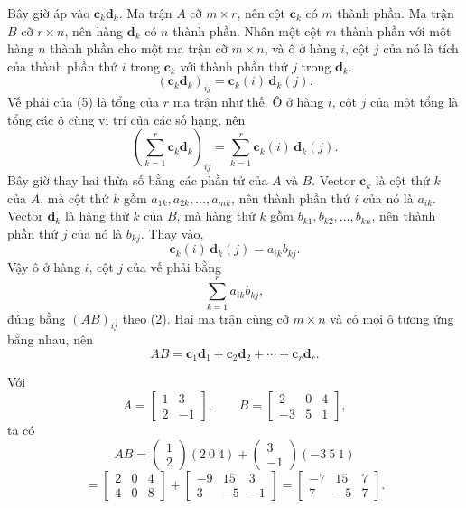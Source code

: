 \documentclass[12pt,a4paper]{article}
\begin{document}
Bây giờ áp vào \(\mathbf{c}_k\mathbf{d}_k\). Ma trận \(A\) cỡ \(m\times r\), nên cột \(\mathbf{c}_k\) có \(m\) thành phần. Ma trận \(B\) cỡ \(r\times n\), nên hàng \(\mathbf{d}_k\) có \(n\) thành phần. Nhân một cột \(m\) thành phần với một hàng \(n\) thành phần cho một ma trận cỡ \(m\times n\), và ô ở hàng \(i\), cột \(j\) của nó là tích của thành phần thứ \(i\) trong \(\mathbf{c}_k\) với thành phần thứ \(j\) trong \(\mathbf{d}_k\).
$$
(\mathbf{c}_k\mathbf{d}_k)_{ij}=\mathbf{c}_k(i)\,\mathbf{d}_k(j).
$$
Vế phải của (5) là tổng của \(r\) ma trận như thế. Ô ở hàng \(i\), cột \(j\) của một tổng là tổng các ô cùng vị trí của các số hạng, nên
$$
\left(\sum_{k=1}^{r}\mathbf{c}_k\mathbf{d}_k\right)_{ij}
=\sum_{k=1}^{r}\mathbf{c}_k(i)\,\mathbf{d}_k(j).
$$
Bây giờ thay hai thừa số bằng các phần tử của \(A\) và \(B\). Vector \(\mathbf{c}_k\) là cột thứ \(k\) của \(A\), mà cột thứ \(k\) gồm \(a_{1k},a_{2k},\ldots,a_{mk}\), nên thành phần thứ \(i\) của nó là \(a_{ik}\). Vector \(\mathbf{d}_k\) là hàng thứ \(k\) của \(B\), mà hàng thứ \(k\) gồm \(b_{k1},b_{k2},\ldots,b_{kn}\), nên thành phần thứ \(j\) của nó là \(b_{kj}\). Thay vào,
$$
\mathbf{c}_k(i)\,\mathbf{d}_k(j)=a_{ik}b_{kj}.
$$
Vậy ô ở hàng \(i\), cột \(j\) của vế phải bằng
$$
\sum_{k=1}^{r}a_{ik}b_{kj},
$$
đúng bằng \((AB)_{ij}\) theo (2). Hai ma trận cùng cỡ \(m\times n\) và có mọi ô tương ứng bằng nhau, nên
$$
AB=\mathbf{c}_1\mathbf{d}_1+\mathbf{c}_2\mathbf{d}_2+\cdots+\mathbf{c}_r\mathbf{d}_r.
$$

Với
$$
A=\left[ \begin{array}{rr} 1 & 3\\ 2 & -1 \end{array} \right],\qquad
B=\left[ \begin{array}{rrr} 2 & 0 & 4\\ -3 & 5 & 1 \end{array} \right],
$$
ta có
$$
AB=
\left( \begin{array}{c} 1\\ 2 \end{array} \right)(2\ 0\ 4)
+
\left( \begin{array}{c} 3\\ -1 \end{array} \right)(-3\ 5\ 1)
$$
$$
=
\left[ \begin{array}{rrr} 2 & 0 & 4\\ 4 & 0 & 8 \end{array} \right]
+
\left[ \begin{array}{rrr} -9 & 15 & 3\\ 3 & -5 & -1 \end{array} \right]
=
\left[ \begin{array}{rrr} -7 & 15 & 7\\ 7 & -5 & 7 \end{array} \right].
$$
\end{document}
